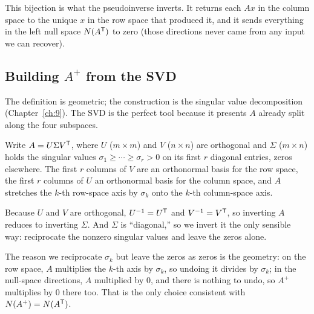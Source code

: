 This bijection is what the pseudoinverse inverts. It returns each $Ax$ in the column space to the unique $x$ in the row space that produced it, and it sends everything in the left null space $N(A^{\mathsf T})$ to zero (those directions never came from any input we can recover).


\subsection{Building \texorpdfstring{$A^{+}$}{A+} from the SVD}

The definition is geometric; the construction is the singular value decomposition (Chapter~\ref{ch:9}). The SVD is the perfect tool because it presents $A$ already split along the four subspaces.

Write $A=U\Sigma V^{\mathsf T}$, where $U$ ($m\times m$) and $V$ ($n\times n$) are orthogonal and $\Sigma$ ($m\times n$) holds the singular values $\sigma_1\ge\cdots\ge\sigma_r>0$ on its first $r$ diagonal entries, zeros elsewhere. The first $r$ columns of $V$ are an orthonormal basis for the row space, the first $r$ columns of $U$ an orthonormal basis for the column space, and $A$ stretches the $k$-th row-space axis by $\sigma_k$ onto the $k$-th column-space axis.

Because $U$ and $V$ are orthogonal, $U^{-1}=U^{\mathsf T}$ and $V^{-1}=V^{\mathsf T}$, so inverting $A$ reduces to inverting $\Sigma$. And $\Sigma$ is ``diagonal,'' so we invert it the only sensible way: reciprocate the nonzero singular values and leave the zeros alone.


The reason we reciprocate $\sigma_k$ but leave the zeros as zeros is the geometry: on the row space, $A$ multiplies the $k$-th axis by $\sigma_k$, so undoing it divides by $\sigma_k$; in the null-space directions, $A$ multiplied by $0$, and there is nothing to undo, so $A^{+}$ multiplies by $0$ there too. That is the only choice consistent with $N(A^{+})=N(A^{\mathsf T})$.

